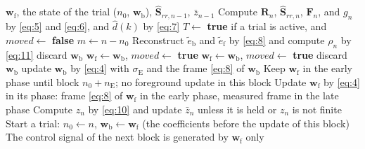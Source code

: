 \begin{algorithm}[tbp]
\caption{Processing of the proposed algorithm in block $n$}
\label{alg:block}
\begin{algorithmic}[1]
\Require $\mathbf{w}_{\mathrm f}$, the state of the trial ($n_0$, $\mathbf{w}_{\mathrm b}$), $\hat{\mathbf{S}}_{rr,n-1}$, $\bar{z}_{n-1}$
\State Compute $\mathbf{R}_n$, $\hat{\mathbf{S}}_{rr,n}$, $\mathbf{F}_n$, and $g_n$ by \eqref{eq:5} and \eqref{eq:6}, and $\hat{d}(k)$ by \eqref{eq:7}
\State $T \gets$ \textbf{true} if a trial is active, and $\mathit{moved} \gets$ \textbf{false}
  \State $m \gets n - n_0$
    \State Reconstruct $\tilde{e}_{\mathrm b}$ and $\tilde{e}_{\mathrm f}$ by \eqref{eq:8} and compute $\rho_n$ by \eqref{eq:11}
     discard $\mathbf{w}_{\mathrm b}$
     $\mathbf{w}_{\mathrm f} \gets \mathbf{w}_{\mathrm b}$, $\mathit{moved} \gets$ \textbf{true}
     $\mathbf{w}_{\mathrm f} \gets \mathbf{w}_{\mathrm b}$, $\mathit{moved} \gets$ \textbf{true}
     discard $\mathbf{w}_{\mathrm b}$
    \EndIf
  \EndIf
   update $\mathbf{w}_{\mathrm b}$ by \eqref{eq:4} with $\sigma_{\mathrm E}$ and the frame \eqref{eq:8} of $\mathbf{w}_{\mathrm b}$
  \EndIf
\EndIf
{}
  \State Keep $\mathbf{w}_{\mathrm f}$ in the early phase until block $n_0 + n_{\mathrm E}$; no foreground update in this block
\Else
  \State Update $\mathbf{w}_{\mathrm f}$ by \eqref{eq:4} in its phase: frame \eqref{eq:8} of $\mathbf{w}_{\mathrm f}$ in the early phase, measured frame in the late phase
\EndIf
\State Compute $z_n$ by \eqref{eq:10} and update $\bar{z}_n$ unless it is held or $z_n$ is not finite
  \State Start a trial: $n_0 \gets n$, $\mathbf{w}_{\mathrm b} \gets \mathbf{w}_{\mathrm f}$ (the coefficients before the update of this block)
\EndIf
\State The control signal of the next block is generated by $\mathbf{w}_{\mathrm f}$ only
\end{algorithmic}
\end{algorithm}

